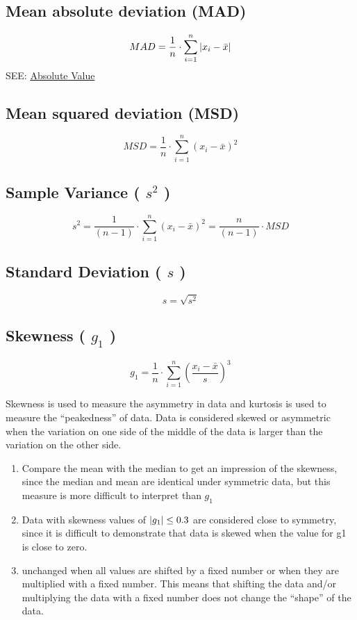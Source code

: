 \subsection{Mean absolute deviation (MAD) \cite{ism-1}}\label{Mean absolute deviation}
\[
    MAD = \displaystyle\dfrac{1}{n} \cdot \sum_{i=1}^{n} \left|  x_i - \bar{x}  \right|
\]
SEE: \hyperref[abs_value]{Absolute Value}


\subsection{Mean squared deviation (MSD) \cite{ism-1}} \label{Mean squared deviation}
\[
    MSD = \displaystyle\dfrac{1}{n} \cdot \sum_{i=1}^{n} ( x_i - \bar{x} )^2
\]


\subsection{Sample Variance ( $s^2$ ) \cite{ism-1}}\label{Sample Variance}
\[
    s^2 = \displaystyle\dfrac{1}{(n-1)} \cdot \sum_{i=1}^{n} ( x_i - \bar{x} )^2 = \displaystyle\dfrac{n}{(n-1)} \cdot MSD
\]

\subsection{Standard Deviation ( $s$ ) \cite{ism-1}}\label{Standard Deviation}
\[
    s = \sqrt{s^2}
\]

\subsection{Skewness ( $g_1$ ) \cite{ism-1}}\label{Skewness}
\[
    g_1 = \displaystyle\dfrac{1}{n} \cdot \sum_{i=1}^{n} \left( \dfrac{x_i - \bar{x}}{s} \right)^3
\]

Skewness is used to measure the asymmetry in data and kurtosis is used to measure the “peakedness” of data. Data is considered skewed or asymmetric when the variation on one side of the middle of the data is larger than the variation on the other side.

\begin{enumerate}
    \item Compare the mean with the median to get an impression of the skewness, since the median and mean are identical under symmetric data, but this measure is more difficult to interpret than $g_1$
    \item Data with skewness values of $\left| g_1 \right| \leq 0.3$ are considered close to symmetry, since it is difficult to demonstrate that data is skewed when the value for g1 is close to zero.
    \item unchanged when all values are shifted by a fixed number or when they are multiplied with a fixed number. This means that shifting the data and/or multiplying the data with a fixed number does not change the “shape” of the data.
\end{enumerate}

